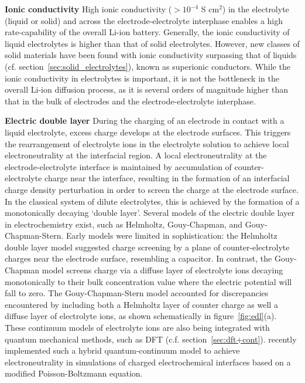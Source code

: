 \documentclass[../main.tex]{subfiles}
\begin{document}
\textbf{Ionic conductivity} High ionic conductivity ($>10^{-4}$ S cm$^2$) in the electrolyte (liquid or solid) and across the electrode-electrolyte interphase enables a high rate-capability of the overall Li-ion battery.\cite{park2010review,Goodenough2010,Kamaya2011} Generally, the ionic conductivity of liquid electrolytes is higher than that of solid electrolytes. However, new classes of solid materials have been found with ionic conductivity surpassing that of liquids (cf. section~\ref{sec:solid_electrolytes}), known as superionic conductors. While the ionic conductivity in electrolytes is important, it is not the bottleneck in the overall Li-ion diffusion process, as it is several orders of magnitude higher than that in the bulk of electrodes and the electrode-electrolyte interphase.\cite{park2010review}

\textbf{Electric double layer} During the charging of an electrode in contact with a liquid electrolyte, excess charge develops at the electrode surfaces. This triggers the rearrangement of electrolyte ions in the electrolyte solution to achieve local electroneutrality at the interfacial region. A local electroneutrality at the electrode-electrolyte interface is maintained by accumulation of counter-electrolyte charge near the interface, resulting in the formation of an interfacial charge density perturbation in order to screen the charge at the electrode surface. In the classical system of dilute electrolytes, this is achieved by the formation of a monotonically decaying `double layer'.\cite{Schmickler2010} Several models of the electric double layer in electrochemistry exist, such as Helmholtz, Gouy-Chapman, and Gouy-Chapman-Stern.\cite{Bard2010} Early models were limited in sophistication: the Helmholtz double layer model suggested charge screening by a plane of counter-electrolyte charges near the electrode surface, resembling a capacitor. In contrast, the Gouy-Chapman model screens charge via a diffuse layer of electrolyte ions decaying monotonically to their bulk concentration value where the electric potential will fall to zero. The Gouy-Chapman-Stern model accounted for discrepancies encountered by including both a Helmholtz layer of counter charge as well a diffuse layer of electrolyte ions, as shown schematically in figure~\ref{fig:edl}(a). These continuum models of electrolyte ions are also being integrated with quantum mechanical methods, such as DFT (c.f. section~\ref{sec:dft+cont}). \citeauthor{neutralization-paper} recently implemented such a hybrid quantum-continuum model to achieve electroneutrality in simulations of charged electrochemical interfaces based on a modified Poisson-Boltzmann equation.\cite{neutralization-paper}
\end{document}

